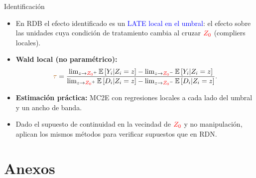 \documentclass[10pt, xcolor=dvipsnames]{beamer}
\begin{document}
\begin{frame}{Identificación}
\begin{itemize}\setlength{\itemsep}{1em}    
    \item En RDB el efecto identificado es un \textcolor{blue}{LATE local en el umbral}: el efecto sobre las unidades cuya condición de tratamiento cambia al cruzar \(\textcolor{red}{Z_0}\) (compliers locales).
    \pause
    \item \textbf{Wald local (no paramétrico):}
    \begin{align*}
        \textcolor{brown}{\tau} = \frac{\lim_{z \to \textcolor{red}{Z_0}^+} \operatorname{\mathbb{E}}\left[Y_i|Z_i = z\right] - \lim_{z \to \textcolor{red}{Z_0}^-} \operatorname{\mathbb{E}}\left[Y_i| Z_i = z\right]}{\lim_{z \to \textcolor{red}{Z_0}^+} \operatorname{\mathbb{E}}\left[D_i|Z_i = z\right] - \lim_{z \to \textcolor{red}{Z_0}^-} \operatorname{\mathbb{E}}\left[D_i| Z_i = z\right]}.
    \end{align*}	
    \pause
    \item \textbf{Estimación práctica:} MC2E con regresiones locales a cada lado del umbral y un ancho de banda. 
    \pause
    \item Dado el supuesto de continuidad en la vecindad de $\textcolor{red}{Z_0}$ y no manipulación, aplican los mismos métodos para verificar supuestos que en RDN.
\end{itemize}
\end{frame}



\section{Anexos}
\end{document}
